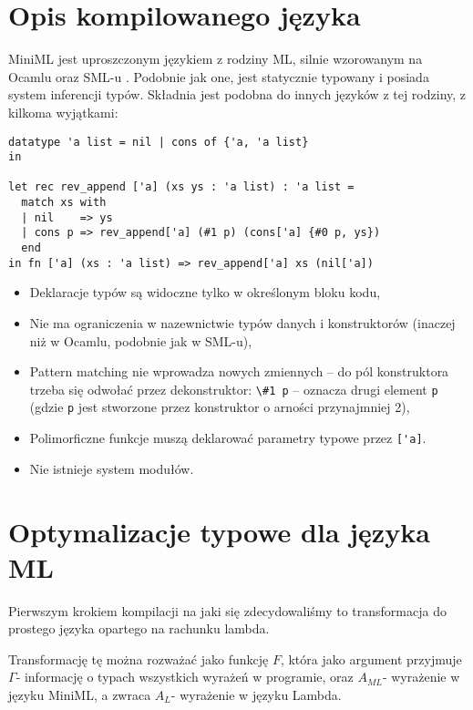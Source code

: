 \documentclass[11pt]{scrartcl}
\begin{document}
\section{Opis kompilowanego języka}
MiniML jest uproszczonym językiem z rodziny ML, silnie wzorowanym na Ocamlu
\cite{Leroy16} oraz SML-u \cite[Chapter 1. What is ML?]{Appel}.
Podobnie jak one, jest statycznie typowany i posiada system inferencji typów.
Składnia jest podobna do innych języków z tej rodziny, z kilkoma wyjątkami:
\begin{lstlisting}[caption=Przykład deklaracji typu danych w MiniML]
datatype 'a list = nil | cons of {'a, 'a list}
in

let rec rev_append ['a] (xs ys : 'a list) : 'a list =
  match xs with
  | nil    => ys
  | cons p => rev_append['a] (#1 p) (cons['a] {#0 p, ys})
  end
in fn ['a] (xs : 'a list) => rev_append['a] xs (nil['a])
\end{lstlisting}
\begin{itemize}
\item Deklaracje typów są widoczne tylko w określonym bloku kodu,
\item Nie ma ograniczenia w nazewnictwie typów danych i konstruktorów
  (inaczej niż w Ocamlu, podobnie jak w SML-u),
\item Pattern matching nie wprowadza nowych zmiennych -- do pól konstruktora
  trzeba się odwołać przez dekonstruktor: \lstinline|\#1 p| -- oznacza drugi element \lstinline|p|
  (gdzie \lstinline|p| jest stworzone przez konstruktor o arności przynajmniej 2),
\item Polimorficzne funkcje muszą deklarować parametry typowe przez \lstinline|['a]|.
\item Nie istnieje system modułów.
\end{itemize}



\section{Optymalizacje typowe dla języka ML}
Pierwszym krokiem kompilacji na jaki się zdecydowaliśmy to transformacja do
prostego języka opartego na rachunku lambda.

Transformację tę można rozważać jako funkcję $F$, która jako argument przyjmuje
$\Gamma$- informację o typach wszystkich wyrażeń w programie, oraz $A_{ML}$-
wyrażenie w języku MiniML, a zwraca $A_L$- wyrażenie w języku Lambda.
\end{document}
